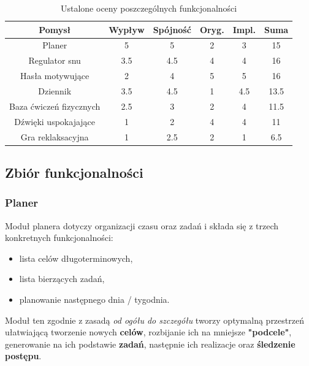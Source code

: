 \begin{table}[h]
    \centering
    \begin{tabular}{ | c | c | c | c | c | c | }
        \hline
        \textbf{Pomysł}         & \textbf{Wypływ} & \textbf{Spójność} &
        \textbf{Oryg.}          & \textbf{Impl.}  & \textbf{Suma}
        \\
        \hline
        Planer                  & 5               & 5                 & 2 & 3
        & 15
        \\
        \hline
        Regulator snu           & 3.5             & 4.5               & 4 & 4
        & 16
        \\
        \hline
        Hasła motywujące        & 2               & 4                 & 5 & 5
        & 16
        \\
        \hline
        Dziennik                & 3.5             & 4.5               & 1 & 4.5
                                & 13.5 \\
        \hline
        \hline
        Baza ćwiczeń fizycznych & 2.5             & 3                 & 2 & 4
        & 11.5
        \\
        \hline
        Dźwięki uspokajające    & 1               & 2                 & 4 & 4
        & 11
        \\
        \hline
        Gra reklaksacyjna       & 1               & 2.5               & 2 & 1
        & 6.5
        \\
        \hline
    \end{tabular}
    \caption{Ustalone oceny poszczególnych funkcjonalności}
    \label{oceny}
\end{table}

\subsection{Zbiór funkcjonalności}

\subsubsection*{Planer}
Moduł planera dotyczy organizacji czasu oraz zadań i składa się z trzech
konkretnych funkcjonalności:

\begin{itemize}
    \item lista celów długoterminowych,
    \item lista bierzących zadań,
    \item planowanie następnego dnia / tygodnia.
\end{itemize}
Moduł ten zgodnie z zasadą \textit{od ogółu do szczegółu} tworzy optymalną
przestrzeń ułatwiającą tworzenie nowych \textbf{celów}, rozbijanie ich na
mniejsze \textbf{"podcele"}, generowanie na ich podstawie \textbf{zadań},
następnie ich realizacje oraz \textbf{śledzenie postępu}.

